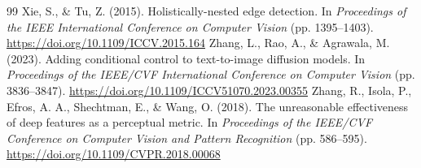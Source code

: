 \documentclass[10pt,a4paper,twocolumn]{article}
\begin{document}
{\begin{thebibliography}{99}
 Xie, S., \& Tu, Z. (2015). Holistically-nested edge detection. In \emph{Proceedings of the IEEE International Conference on Computer Vision} (pp. 1395--1403). \url{https://doi.org/10.1109/ICCV.2015.164}
 Zhang, L., Rao, A., \& Agrawala, M. (2023). Adding conditional control to text-to-image diffusion models. In \emph{Proceedings of the IEEE/CVF International Conference on Computer Vision} (pp. 3836--3847). \url{https://doi.org/10.1109/ICCV51070.2023.00355}
 Zhang, R., Isola, P., Efros, A. A., Shechtman, E., \& Wang, O. (2018). The unreasonable effectiveness of deep features as a perceptual metric. In \emph{Proceedings of the IEEE/CVF Conference on Computer Vision and Pattern Recognition} (pp. 586--595). \url{https://doi.org/10.1109/CVPR.2018.00068}
\end{thebibliography}
}
\end{document}
